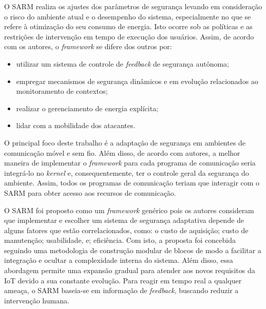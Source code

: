 \documentclass[tid,table]{texufpel} %
\begin{document}
O SARM realiza os ajustes dos parâmetros de segurança levando em consideração o risco do ambiente atual e o desempenho do sistema, especialmente no que se refere à otimização do seu consumo de energia. Isto ocorre sob as políticas e as restrições de intervenção em tempo de execução dos usuários. Assim, de acordo com os autores, o \textit{framework} se difere dos outros por:

\begin{itemize}
\item utilizar um sistema de controle de \textit{feedback} de segurança autônoma;
\item empregar mecanismos de segurança dinâmicos e em evolução relacionados ao monitoramento de contextos;
\item realizar o gerenciamento de energia explícita;
\item lidar com a mobilidade dos atacantes.
\end{itemize}

O principal foco deste trabalho é a adaptação de segurança em ambientes de comunicação móvel e sem fio. Além disso, de acordo com autores, a melhor maneira de implementar o \textit{framework} para cada programa de comunicação seria integrá-lo no \textit{kernel} e, consequentemente, ter o controle geral da segurança do ambiente. Assim, todos os programas de comunicação teriam que interagir com o SARM para obter acesso aos recursos de comunicação.

O SARM foi proposto como um \textit{framework} genérico pois os autores consideram que implementar e escolher um sistema de segurança adaptativa depende de alguns fatores que estão correlacionados, como: o custo de aquisição; custo de manutenção; usabilidade, e; eficiência. Com isto, a proposta foi concebida seguindo uma metodologia de construção modular de blocos de modo a facilitar a integração e ocultar a complexidade interna do sistema. Além disso, essa abordagem permite uma expansão gradual para atender aos novos requisitos da IoT devido a sua constante evolução. Para reagir em tempo real a qualquer ameaça, o SARM baseia-se em informação de \textit{feedback}, buscando reduzir a intervenção humana.
\end{document}
